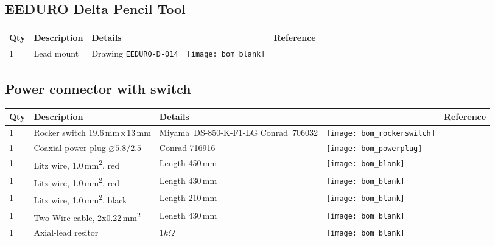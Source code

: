\subsection{EEDURO Delta Pencil Tool}
\label{sec:bom-pencilset}

\begin{tabular}{m{0.5cm} m{5cm} m{5cm} m{1cm} m{1.5cm}}
\bfseries Qty & \bfseries Description               & \bfseries Details                &                                               & \bfseries Reference \\
\hline
1    & Lead mount                                   & Drawing \texttt{EEDURO-D-014}    & \texttt{[image: bom\_blank]}       &                     \\
\hline
\end{tabular}

\subsection{Power connector with switch}
\label{sec:bom-pwr}

\begin{tabular}{m{0.5cm} m{5cm} m{5cm} m{1cm} m{1.5cm}}
\bfseries Qty  & \bfseries Description               & \bfseries Details                                 &                                                & \bfseries Reference \\
\hline
1    & Rocker switch 19.6\,mm\,x\,13\,mm             & \mbox{Miyama DS-850-K-F1-LG} \mbox{Conrad 706032} & \texttt{[image: bom\_rockerswitch]} &           \\
\hline
1    & Coaxial power plug $\varnothing 5.8/2.5$      & Conrad 716916                                     & \texttt{[image: bom\_powerplug]}    &           \\
\hline
1    & Litz wire, 1.0\,mm\textsuperscript{2}, red    & Length 450\,mm                                    & \texttt{[image: bom\_blank]}        &           \\
\hline
1    & Litz wire, 1.0\,mm\textsuperscript{2}, red    & Length 430\,mm                                    & \texttt{[image: bom\_blank]}        &           \\
\hline
1    & Litz wire, 1.0\,mm\textsuperscript{2}, black  & Length 210\,mm                                    & \texttt{[image: bom\_blank]}        &           \\
\hline
1    & Two-Wire cable, 2x0.22\,mm\textsuperscript{2} & Length 430\,mm                                    & \texttt{[image: bom\_blank]}        &           \\
\hline
1    & Axial-lead resitor                            & $1k\Omega$                                        & \texttt{[image: bom\_blank]}        &           \\
\hline
\end{tabular}

